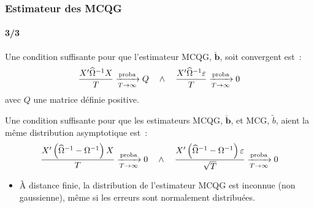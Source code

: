 \documentclass[10pt]{beamer}
\begin{document}
\begin{frame}
  \frametitle{Estimateur des MCQG}
  \framesubtitle{3/3}

  \begin{prop}\label{prop:mcqg:convergence}
    Une condition suffisante pour que l'estimateur MCQG, $\breve{\mathbf b}$, soit convergent est~:
    \[
      \frac{X'\widehat{\Omega}^{-1}X}{T} \xrightarrow[T\rightarrow\infty]{\text{proba}} Q \quad \land \quad \frac{X'\widehat{\Omega}^{-1}\varepsilon}{T} \xrightarrow[T\rightarrow\infty]{\text{proba}} 0
    \]
    avec $Q$ une matrice définie positive.
  \end{prop}


  \begin{prop}\label{prop:mcqg:adist}
    Une condition suffisante pour que les estimateurs MCQG, $\breve{\mathbf b}$, et MCG, $\tilde{b}$, aient la même distribution asymptotique est~:
    \[
      \frac{X'\left( \widehat{\Omega}^{-1} - \Omega^{-1} \right) X}{T} \xrightarrow[T\rightarrow\infty]{\text{proba}} 0 \quad \land \quad \frac{X' \left( \widehat{\Omega}^{-1} - \Omega^{-1} \right)  \varepsilon}{\sqrt{T}} \xrightarrow[T\rightarrow\infty]{\text{proba}} 0
    \]
  \end{prop}


  \begin{itemize}

  \item[\dbend] À distance finie, la distribution de l'estimateur MCQG est inconnue (non gaussienne), même si les erreurs sont normalement distribuées.

  \end{itemize}

\end{frame}
\end{document}
